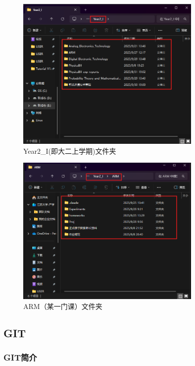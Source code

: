\documentclass[a4paper,12pt]{article}
\begin{document}
\begin{figure}[h]
\centering
\includegraphics[width=0.8\textwidth]{images/image-20251001123651301.png}
\caption{Year2\_I(即大二上学期)文件夹}
\end{figure}

\begin{figure}[h]
\centering
\includegraphics[width=0.8\textwidth]{images/image-20251001123916351.png}
\caption{ARM（某一门课）文件夹}
\end{figure}

\subsection{GIT}
\label{sec:git}

\subsubsection{GIT简介}
\end{document}
